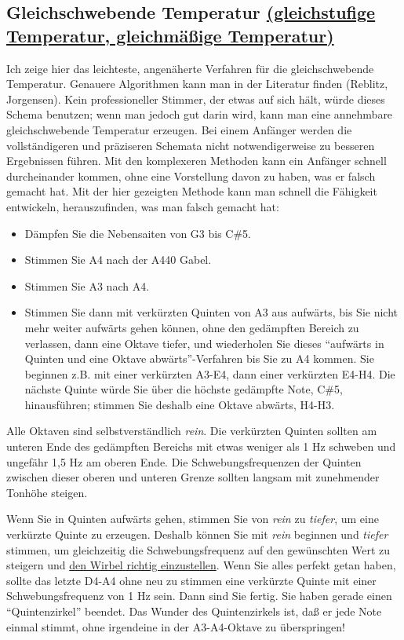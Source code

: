 \subsection{Gleichschwebende Temperatur \protect\hyperlink{et}{(gleichstufige Temperatur, gleichmäßige Temperatur)}}

Ich zeige hier das leichteste, angenäherte Verfahren für die gleichschwebende Temperatur.
 Genauere Algorithmen kann man in der Literatur finden (Reblitz, Jorgensen).
 Kein professioneller Stimmer, der etwas auf sich hält, würde dieses Schema benutzen; wenn man jedoch gut darin wird, kann man eine annehmbare gleichschwebende Temperatur erzeugen.
 Bei einem Anfänger werden die vollständigeren und präziseren Schemata nicht notwendigerweise zu besseren Ergebnissen führen.
 Mit den komplexeren Methoden kann ein Anfänger schnell durcheinander kommen, ohne eine Vorstellung davon zu haben, was er falsch gemacht hat.
 Mit der hier gezeigten Methode kann man schnell die Fähigkeit entwickeln, herauszufinden, was man falsch gemacht hat:
 
\begin{itemize}
	\item Dämpfen Sie die Nebensaiten von G3 bis C\#5.
	\item Stimmen Sie A4 nach der A440 Gabel.
	\item Stimmen Sie A3 nach A4.
	\item Stimmen Sie dann mit verkürzten Quinten von A3 aus aufwärts, bis Sie nicht mehr weiter aufwärts gehen können, ohne den gedämpften Bereich zu verlassen, dann eine Oktave tiefer, und wiederholen Sie dieses \enquote{aufwärts in Quinten und eine Oktave abwärts}-Verfahren bis Sie zu A4 kommen.
 Sie beginnen z.B. mit einer verkürzten A3-E4, dann einer verkürzten E4-H4.
 Die nächste Quinte würde Sie über die höchste gedämpfte Note, C\#5, hinausführen; stimmen Sie deshalb eine Oktave abwärts, H4-H3.
\end{itemize}


 Alle Oktaven sind selbstverständlich \textit{rein}.
 Die verkürzten Quinten sollten am unteren Ende des gedämpften Bereichs mit etwas weniger als 1 Hz schweben und ungefähr 1,5 Hz am oberen Ende.
 Die Schwebungsfrequenzen der Quinten zwischen dieser oberen und unteren Grenze sollten langsam mit zunehmender Tonhöhe steigen.
 

Wenn Sie in Quinten aufwärts gehen, stimmen Sie von \textit{rein} zu \textit{tiefer}, um eine verkürzte Quinte zu erzeugen.
 Deshalb können Sie mit \textit{rein} beginnen und \textit{tiefer} stimmen, um gleichzeitig die Schwebungsfrequenz auf den gewünschten Wert zu steigern und \hyperlink{c2_5_wirb}{den Wirbel richtig einzustellen}.
 Wenn Sie alles perfekt getan haben, sollte das letzte D4-A4 ohne neu zu stimmen eine verkürzte Quinte mit einer Schwebungsfrequenz von 1 Hz sein.
 Dann sind Sie fertig.
 Sie haben gerade einen \enquote{Quintenzirkel} beendet.
 Das Wunder des Quintenzirkels ist, daß er jede Note einmal stimmt, ohne irgendeine in der A3-A4-Oktave zu überspringen!
 

